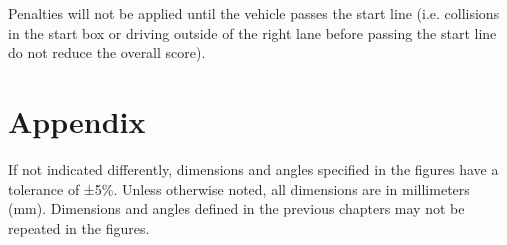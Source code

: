 \documentclass[a4paper]{report}
\begin{document}
Penalties will not be applied until the vehicle passes the start line (i.e.
collisions in the start box or driving outside of the right lane before passing
the start line do not reduce the overall score).

%
%

\appendix
\chapter{Appendix}
If not indicated differently, dimensions and angles specified in the figures
have a tolerance of ±5\%. Unless otherwise noted, all dimensions are in
millimeters (mm). Dimensions and angles defined in the previous chapters may
not be repeated in the figures.
\end{document}
